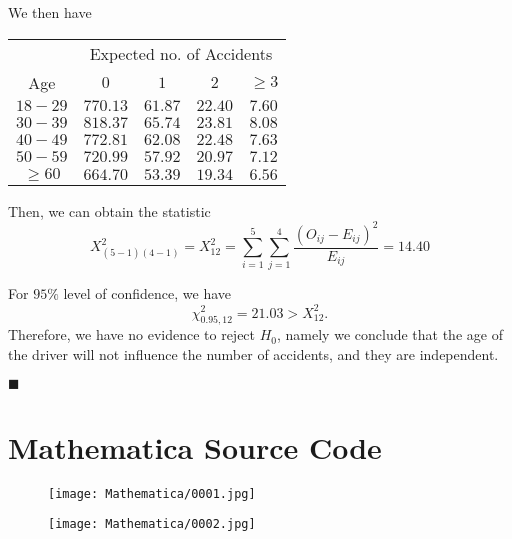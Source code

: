 \documentclass[13pt]{article}
\newcommand{\myqed}{\hfill$\blacksquare$}
\begin{document}
\par We then have 
\begin{table}[H]
    \centering
    \begin{tabular}{c | cccc}
        \toprule
         & \multicolumn{4}{c}{Expected no. of Accidents}\\ \cline{2-5}
        Age & $0$ & $1$ & $2$ & $\geq 3$\\
        \midrule
        $18 - 29$ & $770.13$ & $61.87$ & $22.40$ & $7.60$\\
        $30 - 39$ & $818.37$ & $65.74$ & $23.81$ & $8.08$\\
        $40 - 49$ & $772.81$ & $62.08$ & $22.48$ & $7.63$\\
        $50 - 59$ & $720.99$ & $57.92$ & $20.97$ & $7.12$\\
        $\geq 60$ & $664.70$ & $53.39$ & $19.34$ & $6.56$\\
        \midrule
    \end{tabular}
\end{table}

\par Then, we can obtain the statistic
\begin{equation*}
    X^2_{(5-1)(4-1)} = X^2_{12} = \sum^5_{i = 1}\sum^4_{j = 1}\frac{(O_{ij} - E_{ij})^2}{E_{ij}} = 14.40
\end{equation*}

\par For $95\%$ level of confidence, we have 
\begin{equation*}
    \chi^2_{0.95, 12} = 21.03 > X^2_{12}.
\end{equation*}
Therefore, we have no evidence to reject $H_0$, namely we conclude that the age of the driver will not influence the number 
of accidents, and they are independent.

\myqed

\newpage
\appendix
\section*{Mathematica Source Code}
\begin{figure}[H]
    \centering
    \texttt{[image: Mathematica/0001.jpg]}
\end{figure}

\begin{figure}[H]
    \centering
    \texttt{[image: Mathematica/0002.jpg]}
\end{figure}
\end{document}
